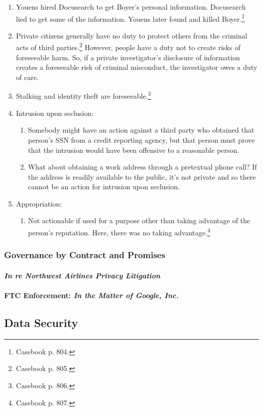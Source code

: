 \begin{enumerate}
    \item Youens hired Docusearch to get Boyer's personal information. 
    Docusearch lied to get some of the information. Youens later found and 
    killed Boyer.\footnote{Casebook p. 804.}
    \item Private citizens generally have no duty to protect others from the 
    criminal acts of third parties.\footnote{Casebook p. 805.} However, people 
    have a duty not to create risks of foreseeable harm. So, if a private 
    investigator's disclosure of information creates a foreseeable risk of 
    criminal misconduct, the investigator owes a duty of care.
    \item Stalking and identity theft are foreseeable.\footnote{Casebook p. 
    806.}
    \item Intrusion upon seclusion:
    \begin{enumerate}
        \item Somebody might have an action against a third party who obtained 
        that person's SSN from a credit reporting agency, but that person must 
        prove that the intrusion would have been offensive to a reasonable 
        person.
        \item What about obtaining a work address through a pretextual phone 
        call? If the address is readily available to the public, it's not 
        private and so there cannot be an action for intrusion upon seclusion.
    \end{enumerate}
    \item Appropriation:
    \begin{enumerate}
        \item Not actionable if used for a purpose other than taking advantage 
        of the person's reputation. Here, there was no taking 
        advantage.\footnote{Casebook p. 807.}
    \end{enumerate}
\end{enumerate}

\subsubsection{Governance by Contract and Promises}

\paragraph{\emph{In re Northwest Airlines Privacy Litigation}}


\paragraph{FTC Enforcement: \emph{In the Matter of Google, Inc.}}



\subsection{Data Security}

